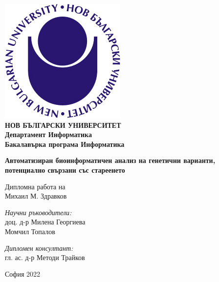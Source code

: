 \documentclass[pdftex,cyrillic,14pt,a4page,twoside]{extreport}
\begin{document}
\begin{titlepage}
	\begin{center}
	\includegraphics[scale=1.2]{./NBU_logo.jpg}\\[0.3cm]
    \textbf{\Large НОВ БЪЛГАРСКИ УНИВЕРСИТЕТ\\[0.4cm]}
    \textbf{\Large Департамент Информатика\\[0.4cm]}
    \textbf{\Large Бакалавърка програма Информатика\\[3cm]}
   
		\textbf{\LARGE Автоматизиран биоинформатичен анализ на генетични варианти, потенциално свързани със стареенето\\[2cm]}
		\begin{Large}
		Дипломна работа на\\[0.2cm]
		Михаил М. Здравков\\[3cm]
		\end{Large}
		\begin{minipage}{0.48\textwidth}
			\begin{flushleft} \large
				\emph{Научни ръководители:} \\
				доц. д-р Милена Георгиева \\
				Момчил Топалов
			\end{flushleft}
		\end{minipage}
			\begin{minipage}{0.48\textwidth}
			\begin{flushright} \large
				\emph{Дипломен консултант:} \\
				гл. ас. д-р Методи Трайков\\
				\clearpage
			\end{flushright}
		\end{minipage}

		\vfill

		{\large София 2022}

	\end{center}
\end{titlepage}
\end{document}

